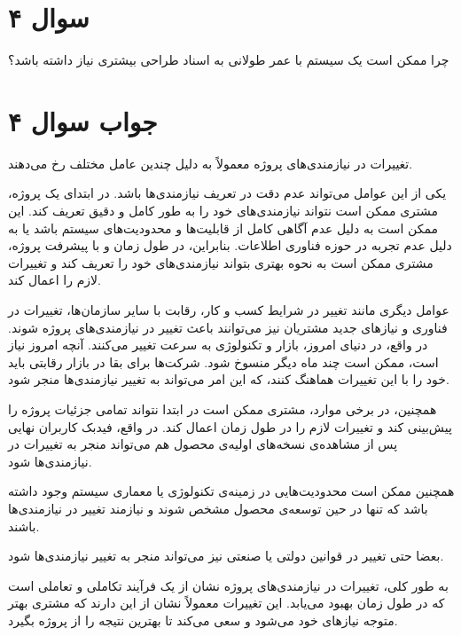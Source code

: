 \section*{سوال ۴}

چرا ممکن است یک سیستم با عمر طولانی به اسناد طراحی بیشتری نیاز داشته باشد؟

\section*{جواب سوال ۴}

تغییرات در نیازمندی‌های پروژه معمولاً به دلیل چندین عامل مختلف رخ می‌دهند.


یکی از این عوامل می‌تواند عدم دقت در تعریف نیازمندی‌ها باشد. در ابتدای یک پروژه، مشتری ممکن است نتواند نیازمندی‌های خود را به طور کامل و دقیق تعریف کند. این ممکن است به دلیل عدم آگاهی کامل از قابلیت‌ها و محدودیت‌های سیستم باشد یا به دلیل عدم تجربه در حوزه فناوری اطلاعات. بنابراین، در طول زمان و با پیشرفت پروژه، مشتری ممکن است به نحوه بهتری بتواند نیازمندی‌های خود را تعریف کند و تغییرات لازم را اعمال کند.


عوامل دیگری مانند تغییر در شرایط کسب و کار، رقابت با سایر سازمان‌ها، تغییرات در فناوری و نیازهای جدید مشتریان نیز می‌توانند باعث تغییر در نیازمندی‌های پروژه شوند. در واقع، در دنیای امروز، بازار و تکنولوژی به سرعت تغییر می‌کنند. آنچه امروز نیاز است، ممکن است چند ماه دیگر منسوخ شود. شرکت‌ها برای بقا در بازار رقابتی باید خود را با این تغییرات هماهنگ کنند، که این امر می‌تواند به تغییر نیازمندی‌ها منجر شود.


همچنین، در برخی موارد، مشتری ممکن است در ابتدا نتواند تمامی جزئیات پروژه را پیش‌بینی کند و تغییرات لازم را در طول زمان اعمال کند. در واقع، فیدبک کاربران نهایی پس از مشاهده‌ی نسخه‌های اولیه‌ی محصول هم می‌تواند منجر به تغییرات در نیازمندی‌ها شود.


همچنین ممکن است محدودیت‌هایی در زمینه‌ی تکنولوژی یا معماری سیستم وجود داشته باشد که تنها در حین توسعه‌ی محصول مشخص شوند و نیازمند تغییر در نیازمندی‌ها باشند.


بعضا حتی تغییر در قوانین دولتی یا صنعتی نیز می‌تواند منجر به تغییر نیازمندی‌ها شود.


به طور کلی، تغییرات در نیازمندی‌های پروژه نشان از یک فرآیند تکاملی و تعاملی است که در طول زمان بهبود می‌یابد. این تغییرات معمولاً نشان از این دارند که مشتری بهتر متوجه نیازهای خود می‌شود و سعی می‌کند تا بهترین نتیجه را از پروژه بگیرد.
